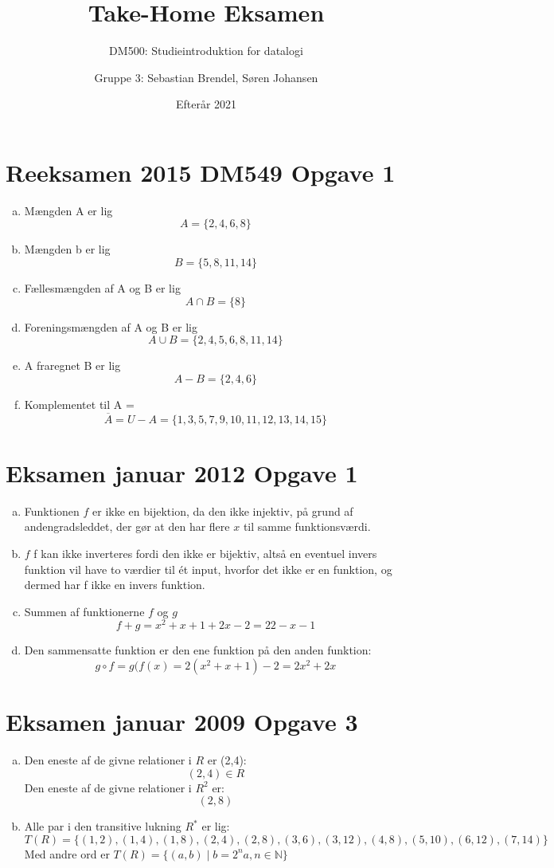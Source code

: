 \documentclass[a4paper, oneside]{scrartcl}
\title{Take-Home Eksamen}
\subtitle{DM500: Studieintroduktion for datalogi}
\date{Efterår 2021}
\author{Gruppe 3: Sebastian Brendel, Søren Johansen}
\begin{document}
\maketitle  
\section*{Reeksamen 2015 DM549 Opgave 1}
\begin{enumerate}[a)]
\item Mængden A er lig \[A = \{2, 4, 6, 8\}\]

\item Mængden b er lig \[B = \{5, 8, 11, 14\}\]

\item Fællesmængden af A og B er lig \[A \cap B = \{8\}\]

\item Foreningsmængden af A og B er lig \[A \cup B = \{2, 4, 5, 6, 8, 11, 14\}\]

\item A fraregnet B er lig \[A - B = \{2, 4, 6\}\]

\item Komplementet til A = \[\overline{A} = U - A = \{1, 3, 5, 7, 9, 10, 11,12, 13, 14, 15\}\]
\end{enumerate}

\section*{Eksamen januar 2012 Opgave 1}

\begin{enumerate}[a)]
    \item Funktionen \(f\) er ikke en bijektion, da den ikke injektiv, på grund af andengradsleddet, der gør at den har flere \(x\) til samme funktionsværdi.
    \item \(f\) f kan ikke inverteres fordi den ikke er bijektiv, altså en eventuel invers funktion vil have to værdier til ét input, hvorfor det ikke er en funktion, og dermed har f ikke en invers funktion.
    \item Summen af funktionerne \( f\) og \(g\) \[f + g = x^2 + x + 1 + 2x -2 = 22 -x -1\]
    \item Den sammensatte funktion er den ene funktion på den anden funktion: \[ g \circ f = g(f(x) = 2(x^2 + x + 1) - 2 = 2x^2 + 2x \]

\end{enumerate}

\section*{Eksamen januar 2009 Opgave 3}

\begin{enumerate}[a)]
\item Den eneste af de givne relationer i \(R\) er (2,4): \[(2, 4)\in R\]
Den eneste af de givne relationer i \(R^2\) er: \[(2, 8)\]

\item Alle par i den transitive lukning \(R^*\) er lig: \[T(R) = \{(1, 2), (1, 4), (1, 8), (2, 4), (2, 8), (3, 6), (3, 12), (4, 8), (5, 10), (6, 12), (7, 14)\}\]
Med andre ord er \(T(R) = \{(a, b) \mid b = 2^na, n \in \mathbb{N}\}\)
\end{enumerate}
\end{document}
